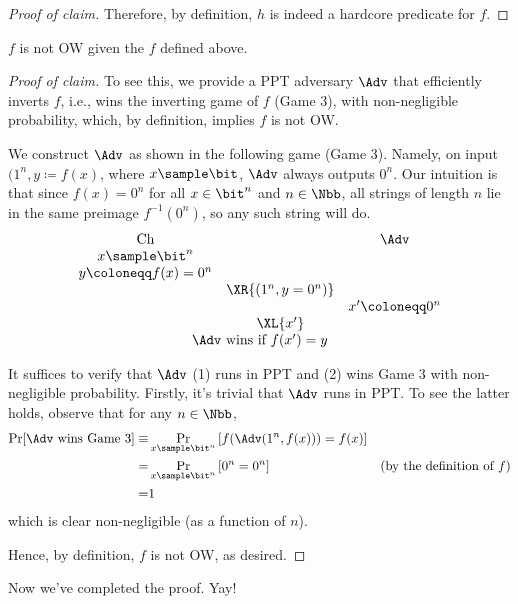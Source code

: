 \begin{answer}[ii]
\begin{proof}[Proof of claim]
    Therefore, by definition, $h$ is indeed a hardcore predicate for $f$.
\end{proof}

\begin{claim}
    $f$ is not OW given the $f$ defined above.
\end{claim}
\begin{proof}[Proof of claim]
    To see this, we provide a PPT adversary $\Adv$ that efficiently inverts $f$, i.e., wins the inverting game of $f$ (Game $3$), with non-negligible probability, which, by definition, implies $f$ is not OW.
    
    We construct $\Adv$ as shown in the following game (Game $3$). Namely, on input $(1^n, y\coloneqq f(x)$, where $x\sample\bit$, $\Adv$ always outputs $0^n$. Our intuition is that since $f(x)=0^n$ for all $x\in\bit^n$ and $n\in\Nbb$, all strings of length $n$ lie in the same preimage $f^{-1}(0^n)$, so any such string will do.
    {
        \[
            \begin{array}{@{} c c c @{}}
            \text{Ch} & & \Adv \\
            x\sample \bit^n & & \\
            y\coloneqq f(x)=0^n & & \\
            & \XR{(1^n, y=0^n)} & \\
            & & x'\coloneqq 0^n \\
            & \XL{x'} & \\
            \multicolumn{3}{c}{\text{$\Adv$ wins if $f(x') = y$}}
            \end{array}
        \]
        \label{fig:p4-game3}
    }
    
    It suffices to verify that $\Adv$ (1) runs in PPT and (2) wins Game $3$ with non-negligible probability. Firstly, it’s trivial that $\Adv$ runs in PPT. To see the latter holds, observe that for any $n\in\Nbb$,
    \begin{align*}
        \Pr[\Adv \textrm{ wins Game } 3]
        \equiv& \Pr_{x\sample\bit^n}\left[ f(\Adv(1^n, f(x))) = f(x) \right] \\
        =& \Pr_{x\sample\bit^n}\left[ 0^n = 0^n \right] & \textrm{(by the definition of $f$)}\\
        =& 1\,
    \end{align*}
    which is clear non-negligible (as a function of $n$).

    Hence, by definition, $f$ is not OW, as desired.
\end{proof}

Now we’ve completed the proof. Yay!
\end{answer}